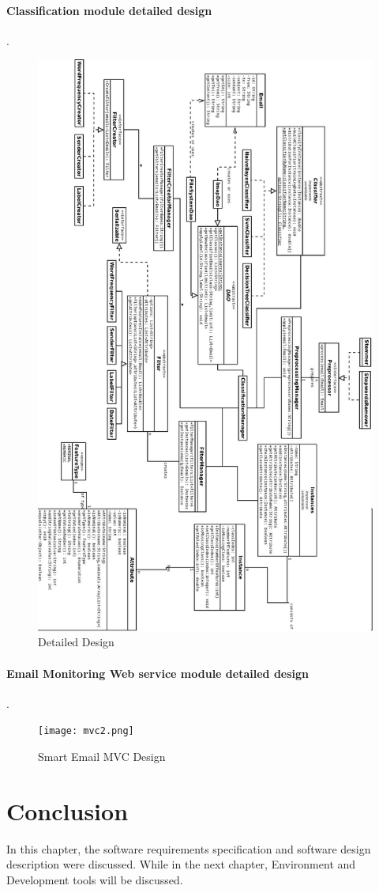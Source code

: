 \paragraph{Classification module detailed design}
.\\
\begin{figure}[H]
  \centering
  \includegraphics[width=12cm]{design.jpeg}
  \caption[Detailed Design] {Detailed Design}
\end{figure}



\paragraph{Email Monitoring Web service module detailed design}
.\\
\begin{figure}[H]
  \centering
  \texttt{[image: mvc2.png]}
  \caption[Smart Email MVC Design]{Smart Email MVC Design}
\end{figure}


\section{Conclusion}
In this chapter, the software requirements specification and software design
description were discussed. While in the next chapter, Environment and 
Development tools will be discussed.
